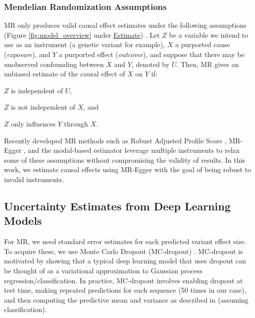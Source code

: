 \documentclass{article}
\begin{document}
\subsubsection{Mendelian Randomization Assumptions}
MR only produces valid causal effect estimates under the following assumptions (Figure \ref{fig:model_overview} under \underline{Estimate}) \cite{lawlor2008mendelian}. Let $ Z $ be a variable we intend to use as an instrument (a genetic variant for example), $ X $ a purported cause (\textit{exposure}), and $ Y $ a purported effect (\textit{outcome}), and suppose that there may be unobserved confounding between $ X $ and $ Y $, denoted by $ U $. Then, MR gives an unbiased estimate of the causal effect of $X$ on $Y$ if:
\begin{compactenum}
    \item $ Z $ is independent of $ U $,
    \item $ Z $ is not independent of $ X $,  and
    \item $ Z $ only influences $ Y $ through $ X $.
\end{compactenum}

Recently developed MR methods such as Robust Adjusted Profile Score \cite{zhao2018statistical}, MR-Egger \cite{bowden2015mendelian}, and the modal-based estimator \cite{burgess2018modal} leverage multiple instruments to relax some of these assumptions without compromising the validity of results. In this work, we estimate causal effects using MR-Egger with the goal of being robust to invalid instruments.

\subsection{Uncertainty Estimates from Deep Learning Models}
\label{sec:dl_uncertainty}
For MR, we need standard error estimates for each predicted variant effect size. To acquire these, we use Monte Carlo Dropout (MC-dropout) \cite{gal2016dropout}. MC-dropout is motivated by showing that a typical deep learning model that uses dropout can be thought of as a variational approximation to Gaussian process regression/classification. In practice, MC-dropout involves enabling dropout at test time, making repeated predictions for each sequence (50 times in our case), and then computing the predictive mean and variance as described in \citet{gal2016dropout} (assuming classification). 
\end{document}
